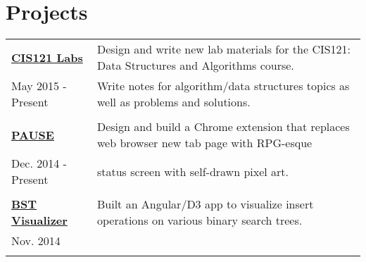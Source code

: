 \documentclass{resume}[10pt, a4paper]
\begin{document}
\section{Projects}
\begin{tabular}{l | l}    
    \textbf{\href{https://github.com/jtcho/CIS121-Labs}{CIS121 Labs}} & Design and write new lab materials for the CIS121: Data Structures and Algorithms course.\\
    May 2015 - Present&Write notes for algorithm/data structures topics as well as problems and solutions.\\\\
    \textbf{\href{https://github.com/jtcho/PAUSE}{PAUSE}} & Design and build a Chrome extension that replaces web browser new tab page with RPG-esque\\
            Dec. 2014 - Present&status screen with self-drawn pixel art.\\\\
    \textbf{\href{http://bst.jtcho.me}{BST Visualizer}} & Built an Angular/D3 app to visualize insert operations on various binary search trees.\\
            Nov. 2014 & \\\\

\end{tabular}
\end{document}
